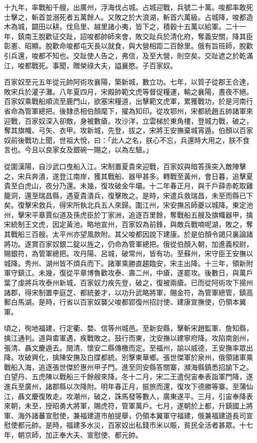 \begin{pinyinscope}
 十九年，率戰船千艘，出廣州，浮海伐占城。占城迎戰，兵號二十萬。唆都率敢死士擊之，斬首並溺死者五萬餘人。又敗之於大浪湖，斬首六萬級。占城降，唆都造木為城，闢田以耕。伐烏里、越里諸小夷，皆下之，積穀十五萬以給軍。二十一年，鎮南王脫歡征交趾，詔唆都帥師來會，敗交趾兵於清化府，奪義安關，降其臣彰憲、昭顯。脫歡命唆都屯天長以就食，與大營相距二百餘里。俄有旨班師，脫歡引兵還，唆都不知也。交趾使人告之，弗信，及至大營，則空矣。交趾遮之於乾滿江，唆都戰死。事聞，贈榮祿大夫，謚襄愍。子百家奴。



 百家奴至元五年從元帥阿術攻襄陽，築新城，數立功。七年，以質子從郡王合達，敗宋兵於灌子灘。八年夏四月，宋殿帥範文虎等督促糧運，輸之襄陽，晝夜不絕。百家奴乘戰船順流至鹿門山，欲塞宋糧道，出擊範文虎軍，累獲戰功，於是河南行省命為管軍總把。後隸丞相伯顏麾下，擢為知印。從攻鄂州，宋都統趙五帥諸軍來迎戰，百家奴深入卻敵，身被數瘡。攻沙洋，立雲梯於東角樓，登城力戰，破之，奪其旗幟、弓矢、衣甲。攻新城，先登，拔之，宋將王安撫棄城宵遁。伯顏以百家奴前後戰功上聞，世祖大悅，曰：「此人之名，朕心不忘，兵還時大用之，朕不食言也。今且以良家女及銀碗一賜之，以為左驗。」



 從圍漢陽，自沙武口曳船入江。宋制置夏貴來迎戰，百家奴與暗答孫突入敵陣擊之，宋兵奔潰，遂登江南岸，獲其戰船、器甲甚多。轉戰至黃州，會日暮，追擊夏貴至白虎山，夜分乃還。未幾，復攻破金牛壩。十二年春正月，與千戶薛赤乾取雞籠洞，還至瑞昌縣，遇夏貴潰兵，復擊敗之。是時，宋遣兵救瑞昌，未至而縣已下矣。復擊宋救兵，得宋所執北兵五人來歸。圍江州，宋安撫呂師夔以城降。東定池州，擊宋平章賈似道及孫虎臣於丁家洲，追逐百里餘，奪戰船五艘及旗幟器甲，擒宋統制王文虎，因定黃池。略地宣州，百家奴為前鋒，與敵兵戰喃呢湖，敗之，奪其戰船三百艘。太平州亦望風款附。其父唆都因說下建康。於是伯顏令謁只裏論諸將功。遂賞百家奴銀二錠以旌之，仍命為管軍總把。俄從伯顏入朝，加進義校尉，賜銀符，為管軍總把。攻丹陽、呂城，破常州，皆有功。至蘇州，宋守臣王安撫以城降。秀州、湖州皆不煩兵而下。諸軍乘勝直趨臨安，宋主出降。十三年，領新附軍守鎮江。未幾，復從平章博魯歡攻泰、壽二州，中瘡，遂罷攻。後數日，與萬戶葉了虔將兵攻泰州新城，百家奴力疾先登，破之，復被兩瘡。已而從阿術攻下揚州諸郡，得宋制置李庭芝、都統姜才，以功升武略將軍，賜金符，為管軍總管，鎮高郵白馬湖。是時，行省以百家奴襲父唆都郢復州招討使、建康宣撫使，仍領本翼軍。



 頃之，徇地福建，行定衢、婺、信等州城邑。至新安縣，擊斬宋趙監軍、詹知縣，擒江通判。道與畬軍遇，疾戰敗之。鼓行而東，沈安撫以建寧府降。攻陷南劍州，張清、聶文慶遁去。閩清、懷安二縣傳檄而定。至福州，諭以威德，王安撫率眾出降。攻破興化，擒陳安撫及白牒都統。別擊東華鄉。張世傑軍於泉州，俄領諸軍乘戰船入海，追逐張世傑於惠州甲子門。進至同安縣答關寨，瀕海縣鎮悉招諭下之。白望丹、五虎陳以戰船三千餘艘來降。冬十二月，宋二王遣倪宙奉表詣軍門降，遂進兵至廣州，諸郡縣以次降附。明年春正月，振旅而還，復攻下德勝等寨。至蒲仙江，聶文慶復敗走。攻潮州，破之，誅馬發等數人，廣東遂平。三月，引宙奉降表來朝，未至，授昭勇大將軍，賜虎符，管軍萬戶。七月，遂朝於上都，升鎮國上將軍、海外諸蕃宣慰使，兼福建道市舶提舉，仍領本翼軍守福建，俄兼福建道長司宣慰使都元帥。是時，福建多水災，百家奴出私錢市米以賑，貧民全活者甚眾。十七年，朝京師，加正奉大夫、宣慰使、都元帥。




\end{pinyinscope}
